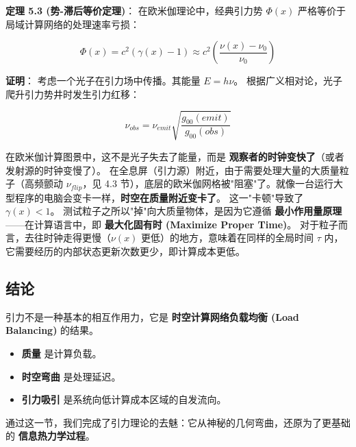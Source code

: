 \textbf{定理 5.3 (势-滞后等价定理)}：
在欧米伽理论中，经典引力势 $\Phi(x)$ 严格等价于局域计算网络的处理速率亏损：

\[\Phi(x) = c^2 \left( \gamma(x) - 1 \right) \approx c^2 \left( \frac{\nu(x) - \nu_0}{\nu_0} \right)\]

\textbf{证明}：
考虑一个光子在引力场中传播。其能量 $E = h\nu$。
根据广义相对论，光子爬升引力势井时发生引力红移：

\[\nu_{obs} = \nu_{emit} \sqrt{\frac{g_{00}(emit)}{g_{00}(obs)}}\]

在欧米伽计算图景中，这不是光子失去了能量，而是 \textbf{观察者的时钟变快了}（或者发射源的时钟变慢了）。
在全息屏（引力源）附近，由于需要处理大量的大质量粒子（高频颤动 $\nu_{flip}$，见 4.3 节），底层的欧米伽网格被"阻塞"了。就像一台运行大型程序的电脑会变卡一样，\textbf{时空在质量附近变卡了}。
这一"卡顿"导致了 $\gamma(x) < 1$。
测试粒子之所以"掉"向大质量物体，是因为它遵循 \textbf{最小作用量原理}——在计算语言中，即 \textbf{最大化固有时 (Maximize Proper Time)}。
对于粒子而言，去往时钟走得更慢（$\nu(x)$ 更低）的地方，意味着在同样的全局时间 $\tau$ 内，它需要经历的内部状态更新次数更少，即计算成本更低。

\subsection{结论}

引力不是一种基本的相互作用力，它是 \textbf{时空计算网络负载均衡 (Load Balancing)} 的结果。

\begin{itemize}
\item \textbf{质量} 是计算负载。
\item \textbf{时空弯曲} 是处理延迟。
\item \textbf{引力吸引} 是系统向低计算成本区域的自发流向。
\end{itemize}

通过这一节，我们完成了引力理论的去魅：它从神秘的几何弯曲，还原为了更基础的 \textbf{信息热力学过程}。
